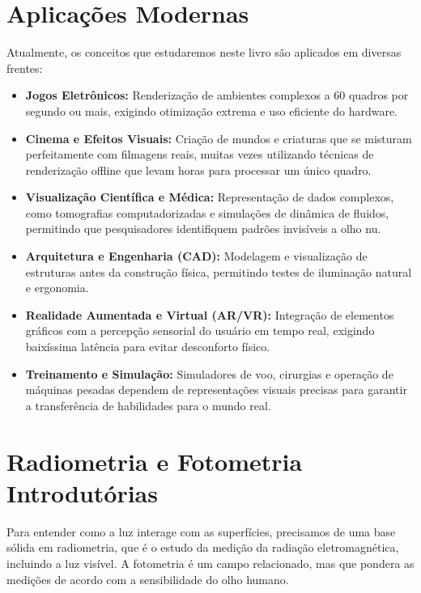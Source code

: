 \section{Aplicações Modernas}

Atualmente, os conceitos que estudaremos neste livro são aplicados em diversas frentes:

\begin{itemize}
    \item \textbf{Jogos Eletrônicos:} Renderização de ambientes complexos a 60 quadros por segundo ou mais, exigindo otimização extrema e uso eficiente do hardware.
    \item \textbf{Cinema e Efeitos Visuais:} Criação de mundos e criaturas que se misturam perfeitamente com filmagens reais, muitas vezes utilizando técnicas de renderização offline que levam horas para processar um único quadro.
    \item \textbf{Visualização Científica e Médica:} Representação de dados complexos, como tomografias computadorizadas e simulações de dinâmica de fluidos, permitindo que pesquisadores identifiquem padrões invisíveis a olho nu.
    \item \textbf{Arquitetura e Engenharia (CAD):} Modelagem e visualização de estruturas antes da construção física, permitindo testes de iluminação natural e ergonomia.
    \item \textbf{Realidade Aumentada e Virtual (AR/VR):} Integração de elementos gráficos com a percepção sensorial do usuário em tempo real, exigindo baixíssima latência para evitar desconforto físico.
    \item \textbf{Treinamento e Simulação:} Simuladores de voo, cirurgias e operação de máquinas pesadas dependem de representações visuais precisas para garantir a transferência de habilidades para o mundo real.
\end{itemize}

\section{Radiometria e Fotometria Introdutórias}

Para entender como a luz interage com as superfícies, precisamos de uma base sólida em radiometria, que é o estudo da medição da radiação eletromagnética, incluindo a luz visível. A fotometria é um campo relacionado, mas que pondera as medições de acordo com a sensibilidade do olho humano.

